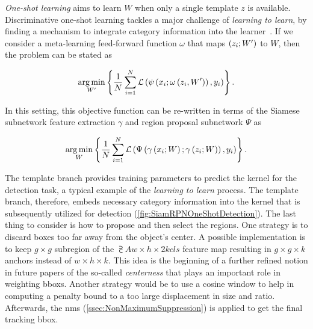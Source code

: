 \noindent \emph{One-shot learning} aims to learn $W$ when only a single template $z$ is available.
Discriminative one-shot learning tackles a major challenge of \emph{learning to learn}, by finding a mechanism to integrate category information into the learner~\cite{Bertinetto2016OneShot}. If we consider a meta-learning feed-forward function $\omega$ that maps $\left( {z_i; W'} \right)$ to $W$, then the problem can be stated as

\begin{equation}
    \label{eq:SiamRPNOneShotMetaLearning}
    \underset{W'}{\operatorname*{arg\,min}}
    \left\{ {
        \frac{1}{N}
        \sum_{i = 1}^{N}
        {\mathcal{L}} \left( 
            {\psi} \left( x_i; {\omega} \left( z_i, W' \right) \right),
            y_i
         \right)
    } \right\}.
\end{equation}

\noindent In this setting, this objective function can be re-written in terms of the Siamese subnetwork feature extraction $\gamma$ and region proposal subnetwork $\Psi$ as

\begin{equation}
    \label{eq:SiamRPNOneShoCombo}
    \underset{W}{\operatorname*{arg\,min}}
    \left\{ {
        \frac{1}{N}
        \sum_{i = 1}^{N}
        {\mathcal{L}} \left( 
            {\Psi} \left( {\gamma} \left( x_i; W \right); {\gamma} \left( z_i; W \right) \right),
            y_i
         \right)
    } \right\}.
\end{equation}

\noindent The template branch provides training parameters to predict the kernel for the detection task, a typical example of the \emph{learning to learn} process. The template branch, therefore, embeds necessary category information into the kernel that is subsequently utilized for detection (\cref{fig:SiamRPNOneShotDetection}). The last thing to consider is how to propose and then select the regions. One strategy is to discard boxes too far away from the object's center. A possible implementation is to keep $g \times g$ subregion of the $\supsub{A}{w \times h \times 2k}{cls}$ feature map resulting in $g \times g \times k$ anchors instead of $w \times h \times k$. This idea is the beginning of a further refined notion in future papers of the so-called \emph{centerness} that plays an important role in weighting \glspl{bbox}. Another strategy would be to use a cosine window to help in computing a penalty bound to a too large displacement in size and ratio. Afterwards, the \gls{nms} (\cref{ssec:NonMaximumSuppression}) is applied to get the final tracking \gls{bbox}.

